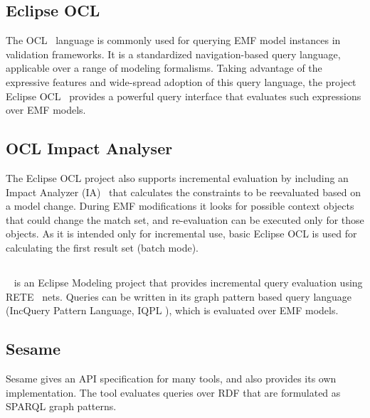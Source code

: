 \subsection{Eclipse OCL}

The OCL~\cite{OCL} language is commonly used for querying EMF model instances in validation frameworks. It is a standardized navigation-based query language, applicable over a range of modeling formalisms. Taking advantage of the expressive features and wide-spread adoption of this query language, the project Eclipse OCL~\cite{EclipseOCL} provides a powerful query interface that evaluates such expressions over EMF models.

\subsection{OCL Impact Analyser}
The Eclipse OCL project also supports incremental evaluation by including an Impact Analyzer (IA)~\cite{ocl-ia2} that calculates the constraints to be reevaluated based on a model change. During EMF modifications it looks for possible context objects that could change the match set, and re-evaluation can be executed only for those objects. As it is intended only for incremental use, basic Eclipse OCL is used for calculating the first result set (batch mode).

\subsection{\incquery{}}

\incquery{}~\cite{models10} is an Eclipse Modeling project that provides incremental query evaluation using RETE~\cite{rete} nets. Queries can be written in its graph pattern based query language (IncQuery Pattern Language, IQPL \cite{iqpl}), which is evaluated over EMF models.

\subsection{Sesame}

Sesame gives an API specification for many tools, and also provides its own implementation. The tool evaluates queries over RDF that are formulated as SPARQL \cite{Sparql} graph patterns.


